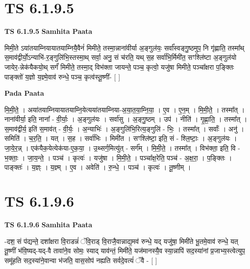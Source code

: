 \documentclass[17pt]{extarticle}
\begin{document}
\section*{ TS 6.1.9.5 }

\textbf{TS 6.1.9.5 } \newline
\textbf{Samhita Paata} \newline

मिमी॒ते ऽया॑तयाम्नियायातयाम्नियै॒वैनं॑ मिमीते॒ तस्मा॒न्नाना॑वीर्या अ॒ङ्गुल॑यः॒ सर्वा᳚स्वङ्गु॒ष्ठमुप॒ नि गृ॑ह्णाति॒ तस्मा᳚थ् स॒माव॑द्वीर्यो॒ऽन्याभि॑-र॒ङ्गुलि॑भि॒स्तस्मा॒थ् सर्वा॒ अनु॒ सं च॑रति॒ यथ् स॒ह सर्वा॑भि॒र्मिमी॑त॒ सꣳश्लि॑ष्टा अ॒ङ्गुल॑यो जायेर॒-न्नेक॑यैकयो॒थ् सर्गं॑ मिमीते॒ तस्मा॒द् विभ॑क्ता जायन्ते॒ पञ्च॒ कृत्वो॒ यजु॑षा मिमीते॒ पञ्चा᳚क्षरा प॒ङ्क्तिः पाङ्क्तो॑ य॒ज्ञो य॒ज्ञ्मे॒वाव॑ रुन्धे॒ पञ्च॒ कृत्व॑स्तू॒ष्णीं- [  ] \newline

\textbf{Pada Paata} \newline

मि॒मी॒ते॒ । अया॑तयाम्नियायातयाम्नि॒येत्यया॑तयाम्निया-अ॒या॒त॒या॒म्नि॒या॒ । ए॒व । ए॒न॒म् । मि॒मी॒ते॒ । तस्मा᳚त् । नाना॑वीर्या॒ इति॒ नाना᳚ - वी॒र्याः॒ । अ॒ङ्गुल॑यः । सर्वा॑सु । अ॒ङ्गु॒ष्ठम् । उप॑ । नीति॑ । गृ॒ह्णा॒ति॒ । तस्मा᳚त् । स॒माव॑द्वीर्य॒ इति॑ स॒माव॑त् - वी॒र्यः॒ । अ॒न्याभिः॑ । अ॒ङ्गुलि॑भि॒रित्य॒ङ्गुलि॑ - भिः॒ । तस्मा᳚त् । सर्वाः᳚ । अनु॑ । समिति॑ । च॒र॒ति॒ । यत् । स॒ह । सर्वा॑भिः । मिमी॑त । सꣳश्लि॑ष्टा॒ इति॒ सं - श्लि॒ष्टाः॒ । अ॒ङ्गुल॑यः । जा॒ये॒र॒न्न् । एक॑यैक॒येत्येक॑या-ए॒क॒या॒ । उ॒थ्सर्ग॒मित्यु॑त् - सर्ग᳚म् । मि॒मी॒ते॒ । तस्मा᳚त् । विभ॑क्ता॒ इति॒ वि - भ॒क्ताः॒ । जा॒य॒न्ते॒ । पञ्च॑ । कृत्वः॑ । यजु॑षा । मि॒मी॒ते॒ । पञ्चा᳚क्ष॒रेति॒ पञ्च॑ - अ॒क्ष॒रा॒ । प॒ङ्क्तिः । पाङ्क्तः॑ । य॒ज्ञ्ः । य॒ज्ञ्म् । ए॒व । अवेति॑ । रु॒न्धे॒ । पञ्च॑ । कृत्वः॑ । तू॒ष्णीम् ।  \newline




\section*{ TS 6.1.9.6 }

\textbf{TS 6.1.9.6 } \newline
\textbf{Samhita Paata} \newline

-दश॒ सं प॑द्यन्ते॒ दशा᳚क्षरा वि॒राडन्नं॑ ॅवि॒राड् वि॒राजै॒वान्नाद्य॒मव॑ रुन्धे॒ यद् यजु॑षा॒ मिमी॑ते भू॒तमे॒वाव॑ रुन्धे॒ यत् तू॒ष्णीं भ॑वि॒ष्यद्-यद्-वै तावा॑ने॒व सोमः॒ स्याद् याव॑न्तं॒ मिमी॑ते॒ यज॑मानस्यै॒व स्या॒न्नापि॑ सद॒स्या॑नां प्र॒जाभ्य॒स्त्वेत्युप॒ समू॑हति सद॒स्या॑ने॒वान्वा भ॑जति॒ वास॒सोप॑ नह्यति सर्वदे॒वत्यं॑ ॅवै - [  ] \newline
\end{document}

